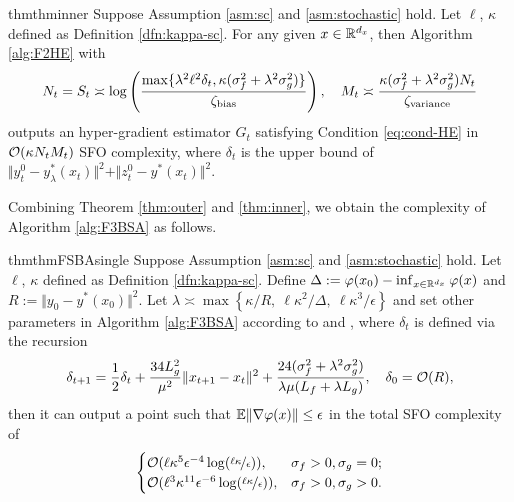 {\begin{restatable}{thm}{thminner} \label{thm:inner}
Suppose Assumption \ref{asm:sc} and \ref{asm:stochastic} hold. 
Let $\ell$,  $\kappa$ defined as Definition \ref{dfn:kappa-sc}. For any given $x \in {\mathbb{R}}^{d_x}$, then Algorithm \ref{alg:F2HE} with 
\begin{align} \label{eq:hyper-F2HE}
    N_t = S_t \asymp \log \left( \frac{\max\{ \lambda^2 \ell^2 \delta_t,   \kappa (\sigma_f^2 + \lambda^2 \sigma_g^2) \}}{ \zeta_{\rm bias} } \right), \quad M_t \asymp \frac{\kappa (\sigma_f^2 + \lambda^2 \sigma_g^2) N_t}{\zeta_{\rm variance}}
\end{align}
outputs an hyper-gradient estimator $G_t$ satisfying Condition \ref{eq:cond-HE} in ${\mathcal{O}}( \kappa N_t M_t)$ SFO complexity, where $\delta_t$ is the upper bound of $\Vert y_t^0 - y_{\lambda}^*(x_t) \Vert^2 + \Vert z_t^0 - y^*(x_t) \Vert^2$.
\end{restatable}

Combining Theorem \ref{thm:outer} and \ref{thm:inner}, we obtain the complexity of Algorithm \ref{alg:F3BSA} as follows. 

\begin{restatable}{thm}{thmFSBAsingle} \label{thm:F3BSA}
Suppose Assumption \ref{asm:sc} and \ref{asm:stochastic} hold. 
Let $\ell$,  $\kappa$ defined as Definition \ref{dfn:kappa-sc}.
Define
$\Delta:=\varphi(x_0) - \inf_{x \in {\mathbb{R}}^{d_x}} \varphi(x)$ and $R := \Vert y_0 - y^*(x_0) \Vert^2 $.
Let $\lambda \asymp \max\left\{\kappa/R,~ \ell \kappa^2/ \Delta, ~ \ell \kappa^3 / \epsilon \right\} $ 
and set other parameters in Algorithm \ref{alg:F3BSA} according to  and , 
where $\delta_t$ is defined via the recursion
\begin{align} \label{eq:recursion-delta-single}
    \delta_{t+1} = \frac{1}{2}\delta_t + \frac{34 L_g^2}{\mu^2}  \Vert x_{t+1} - x_t \Vert^2 + \frac{24 (\sigma_f^2+ \lambda^2 \sigma_g^2)}{\lambda \mu (L_f + \lambda L_g)}, \quad \delta_0 = {\mathcal{O}}(R),
\end{align}
then it
can output a point such that ${\mathbb{E}} \Vert \nabla \varphi(x) \Vert \le \epsilon$ in the total SFO complexity of
\begin{align*}
\begin{cases}
    {\mathcal{O}}(\ell \kappa^5 \epsilon^{-4} \log (\nicefrac{ \ell \kappa}{\epsilon})), & \sigma_f >0 , \sigma_g = 0;\\
    {{\mathcal{O}}(\ell^3 \kappa^{11} \epsilon^{-6} \log (\nicefrac{ \ell \kappa}{\epsilon})) }, & \sigma_f>0, \sigma_g >0.
\end{cases}
\end{align*}
\end{restatable}

}
